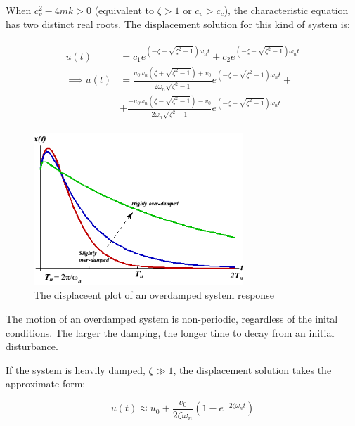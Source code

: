 \documentclass[10pt,b5paper,titlepage]{book}
\newenvironment{eqarray}
{
    \begin{eqnarray}
        \begin{aligned}
}
{
        \end{aligned}
    \end{eqnarray}
}
\begin{document}
When $ c_v^2 - 4 m k > 0 $ (equivalent to $ \zeta > 1 $ or $ c_v > c_c $),
the characteristic equation has two distinct real roots. The displacement
solution for this kind of system is:

\begin{eqarray}
    u(t) &= c_1 e^{\left( -\zeta + \sqrt{\zeta^2 - 1} \right) \omega_n t}
          +  c_2 e^{\left( -\zeta - \sqrt{\zeta^2 - 1} \right) \omega_n t}\\
    \implies u(t) &=
    \frac{u_0 \omega_n \left( \zeta + \sqrt{\zeta^2 - 1} \right) + v_0}
    {2 \omega_n \sqrt{\zeta^2 - 1}} e^{\left( -\zeta + \sqrt{\zeta^2 - 1} \right) \omega_n t} +\\
                  &+
    \frac{-u_0 \omega_n \left( \zeta - \sqrt{\zeta^2 - 1} \right) - v_0}
    {2 \omega_n \sqrt{\zeta^2 - 1}} e^{\left( -\zeta - \sqrt{\zeta^2 - 1} \right) \omega_n t}
\end{eqarray}

\begin{figure}[ht]
    \centering
    \includegraphics[width=0.70\textwidth]{img/SDOF_OverDamped_Response.png}
    \caption{The displaceent plot of an overdamped system response}
    \label{fig:SDOF-overdamped-response-png}
\end{figure}

The motion of an overdamped system is non-periodic, regardless of the inital conditions.
The larger the damping, the longer time to decay from an initial disturbance.

If the system is heavily damped, $ \zeta \gg 1 $, the displacement solution takes
the approximate form:

\begin{equation}
    u(t) \approx u_0 + \frac{v_0}{2 \zeta \omega_n}
    \left(1 - e^{-2 \zeta \omega_n t} \right)
\end{equation}
\end{document}
